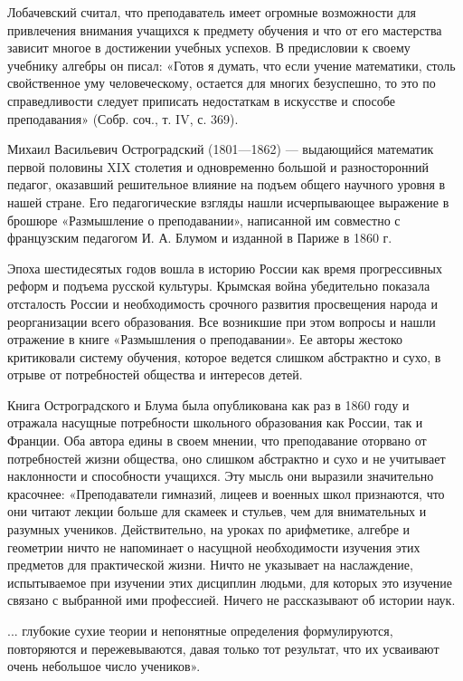 \documentclass[12pt, a4paper, openany]{book}
\begin{document}
Лобачевский считал, что преподаватель имеет огромные возможности для привлечения внимания учащихся к  предмету обучения и что от его мастерства зависит многое в  достижении учебных успехов. В предисловии к своему  учебнику алгебры он писал: «Готов я думать, что если учение математики, столь свойственное уму человеческому,  остается для многих безуспешно, то это по справедливости  следует приписать недостаткам в искусстве и способе  преподавания» (Собр. соч., т. IV, с. 369). 

Михаил Васильевич Остроградский (1801—1862) —  выдающийся математик первой половины XIX столетия и  одновременно большой и разносторонний педагог, оказавший решительное влияние на подъем общего научного уровня в нашей стране. Его педагогические взгляды нашли исчерпывающее выражение в брошюре «Размышление о  преподавании», написанной им совместно с французским  педагогом И. А. Блумом и изданной в Париже в 1860 г. 

Эпоха шестидесятых годов вошла в историю России как время прогрессивных реформ и подъема русской культуры. Крымская война убедительно показала отсталость России и необходимость срочного развития просвещения народа и реорганизации всего образования. Все возникшие при этом вопросы и нашли отражение в книге «Размышления о преподавании». Ее авторы жестоко критиковали систему обучения, которое ведется слишком абстрактно и сухо, в отрыве от потребностей общества и интересов детей. 

Книга Остроградского и Блума была опубликована как раз в 1860 году и отражала насущные потребности  школьного образования как России, так и Франции. Оба автора едины в своем мнении, что преподавание оторвано от  потребностей жизни общества, оно слишком абстрактно и сухо и не учитывает наклонности и способности учащихся. Эту мысль они выразили значительно красочнее:  «Преподаватели гимназий, лицеев и военных школ признаются, что они читают лекции больше для скамеек и стульев, чем для внимательных и разумных учеников. Действительно, на уроках по арифметике, алгебре и геометрии ничто не  напоминает о насущной необходимости изучения этих предметов для практической жизни. Ничто не указывает на  наслаждение, испытываемое при изучении этих дисциплин  людьми, для которых это изучение связано с выбранной ими профессией. Ничего не рассказывают об истории наук. 

... глубокие сухие теории и непонятные определения формулируются, повторяются и пережевываются, давая только тот результат, что их усваивают очень небольшое число учеников». 
\end{document}
